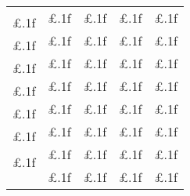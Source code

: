 \documentclass[11pt]{article}
\begin{document}
\begin{table}
\begin{tabular}{|ccccc|}
 & \multirow{2}{*}{£.1f} & \multirow{2}{*}{£.1f} & \multirow{2}{*}{£.1f} & \multirow{2}{*}{£.1f} \\ %
\multirow{2}{*}{£.1f} & & & & \\ \cline{2-5} 
 & \multirow{2}{*}{£.1f} & \multirow{2}{*}{£.1f} & \multirow{2}{*}{£.1f} & \multirow{2}{*}{£.1f} \\ %
\multirow{2}{*}{£.1f} & & & & \\ \cline{2-5} 
 & \multirow{2}{*}{£.1f} & \multirow{2}{*}{£.1f} & \multirow{2}{*}{£.1f} & \multirow{2}{*}{£.1f} \\ %
\multirow{2}{*}{£.1f} & & & & \\ \cline{2-5} 
 & \multirow{2}{*}{£.1f} & \multirow{2}{*}{£.1f} & \multirow{2}{*}{£.1f} & \multirow{2}{*}{£.1f} \\ %
\multirow{2}{*}{£.1f} & & & & \\ \cline{2-5} 
 & \multirow{2}{*}{£.1f} & \multirow{2}{*}{£.1f} & \multirow{2}{*}{£.1f} & \multirow{2}{*}{£.1f} \\ %
\multirow{2}{*}{£.1f} & & & & \\ \cline{2-5} 
 & \multirow{2}{*}{£.1f} & \multirow{2}{*}{£.1f} & \multirow{2}{*}{£.1f} & \multirow{2}{*}{£.1f} \\ %
\multirow{2}{*}{£.1f} & & & & \\ \cline{2-5} 
 & \multirow{2}{*}{£.1f} & \multirow{2}{*}{£.1f} & \multirow{2}{*}{£.1f} & \multirow{2}{*}{£.1f} \\ %
\multirow{2}{*}{£.1f} & & & & \\ \cline{2-5} 
 & \multirow{2}{*}{£.1f} & \multirow{2}{*}{£.1f} & \multirow{2}{*}{£.1f} & \multirow{2}{*}{£.1f} \\ %
 & & & & \\ \hline
\end{tabular}
\end{table}
\end{document}
